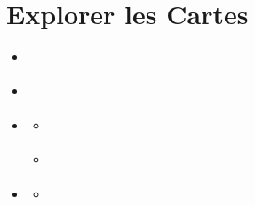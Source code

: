 \documentclass[letterpaper,10pt,english]{sphinxmanual}
\begin{document}
\section{Explorer les Cartes}
\label{\detokenize{fr/04_explorer_cartes:explorer-les-cartes}}\label{\detokenize{fr/04_explorer_cartes:maps-fr}}\label{\detokenize{fr/04_explorer_cartes::doc}}
\begin{sphinxcontents}
\begin{itemize}
\item {} 
\sphinxAtStartPar
{}\label{\detokenize{fr/04_explorer_cartes:id1}}{\hyperref[\detokenize{fr/04_explorer_cartes:trouver-une-carte}]{}}

\item {} 
\sphinxAtStartPar
{}\label{\detokenize{fr/04_explorer_cartes:id2}}{\hyperref[\detokenize{fr/04_explorer_cartes:l-interface-du-visualiseur-de-carte}]{}}

\item {} 
\sphinxAtStartPar
{}\label{\detokenize{fr/04_explorer_cartes:id3}}{\hyperref[\detokenize{fr/04_explorer_cartes:naviguer-dans-la-carte}]{}}
\begin{itemize}
\item {} 
\sphinxAtStartPar
{}\label{\detokenize{fr/04_explorer_cartes:id4}}{\hyperref[\detokenize{fr/04_explorer_cartes:navigation-de-base}]{}}

\item {} 
\sphinxAtStartPar
{}\label{\detokenize{fr/04_explorer_cartes:id5}}{\hyperref[\detokenize{fr/04_explorer_cartes:aller-a-un-emplacement-specifique}]{}}

\end{itemize}

\item {} 
\sphinxAtStartPar
{}\label{\detokenize{fr/04_explorer_cartes:id6}}{\hyperref[\detokenize{fr/04_explorer_cartes:travailler-avec-les-couches}]{}}
\begin{itemize}
\item {} 
\sphinxAtStartPar
{}\label{\detokenize{fr/04_explorer_cartes:id7}}{\hyperref[\detokenize{fr/04_explorer_cartes:ouvrir-le-panneau-de-couches}]{}}


\end{itemize}
\end{itemize}
\end{sphinxcontents}
\end{document}
